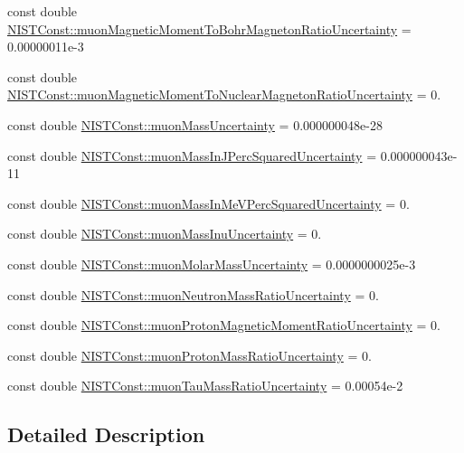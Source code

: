 \begin{DoxyCompactItemize}
\item 
const double \hyperlink{group___n_i_s_t_const-_muon_gacdeb845bce82c4adb3abba35a9cb5169}{N\+I\+S\+T\+Const\+::muon\+Magnetic\+Moment\+To\+Bohr\+Magneton\+Ratio\+Uncertainty} = 0.\+00000011e-\/3
\item 
const double \hyperlink{group___n_i_s_t_const-_muon_gaae88c6b42b479868be61ac4bcc1a0492}{N\+I\+S\+T\+Const\+::muon\+Magnetic\+Moment\+To\+Nuclear\+Magneton\+Ratio\+Uncertainty} = 0.
\item 
const double \hyperlink{group___n_i_s_t_const-_muon_ga9e5356c55812a9d313f3d6b5a5eca437}{N\+I\+S\+T\+Const\+::muon\+Mass\+Uncertainty} = 0.\+000000048e-\/28
\item 
const double \hyperlink{group___n_i_s_t_const-_muon_gacf6e9be254af1b85cc1ee1b0a9a3a2c9}{N\+I\+S\+T\+Const\+::muon\+Mass\+In\+J\+Perc\+Squared\+Uncertainty} = 0.\+000000043e-\/11
\item 
const double \hyperlink{group___n_i_s_t_const-_muon_ga1958d52051686be59d9e4a7ad3a69fa1}{N\+I\+S\+T\+Const\+::muon\+Mass\+In\+Me\+V\+Perc\+Squared\+Uncertainty} = 0.
\item 
const double \hyperlink{group___n_i_s_t_const-_muon_ga55f39b59c02eb2265b4d62332643a439}{N\+I\+S\+T\+Const\+::muon\+Mass\+Inu\+Uncertainty} = 0.
\item 
const double \hyperlink{group___n_i_s_t_const-_muon_gac8084ae83ddad95617db5064d8778c11}{N\+I\+S\+T\+Const\+::muon\+Molar\+Mass\+Uncertainty} = 0.\+0000000025e-\/3
\item 
const double \hyperlink{group___n_i_s_t_const-_muon_gaf1e3125615d29e354cc1ade185c1831c}{N\+I\+S\+T\+Const\+::muon\+Neutron\+Mass\+Ratio\+Uncertainty} = 0.
\item 
const double \hyperlink{group___n_i_s_t_const-_muon_ga366c3261916ab8b323810bb54cb69edc}{N\+I\+S\+T\+Const\+::muon\+Proton\+Magnetic\+Moment\+Ratio\+Uncertainty} = 0.
\item 
const double \hyperlink{group___n_i_s_t_const-_muon_ga61cddfc40a08640b83041efd9d4dbbe2}{N\+I\+S\+T\+Const\+::muon\+Proton\+Mass\+Ratio\+Uncertainty} = 0.
\item 
const double \hyperlink{group___n_i_s_t_const-_muon_gacb8e714cc816309192bb37387da5fa6b}{N\+I\+S\+T\+Const\+::muon\+Tau\+Mass\+Ratio\+Uncertainty} = 0.\+00054e-\/2
\end{DoxyCompactItemize}


\subsection{Detailed Description}


